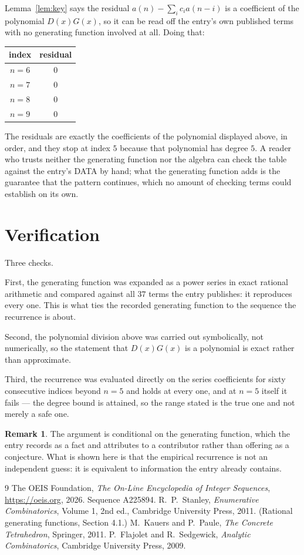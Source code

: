 \documentclass[11pt,a4paper]{article}
\theoremstyle{plain}
\theoremstyle{definition}
\newtheorem{remark}[theorem]{Remark}
\begin{document}
Lemma~\ref{lem:key} says the residual $a(n)-\sum_ic_ia(n-i)$ is a coefficient of the
polynomial $D(x)G(x)$, so it can be read off the entry's own published terms with no
generating function involved at all. Doing that:
\begin{center}
\begin{tabular}{cc}
index & residual \\ \hline
$n=6$ & $0$ \\
$n=7$ & $0$ \\
$n=8$ & $0$ \\
$n=9$ & $0$
\end{tabular}
\end{center}
The residuals are exactly the coefficients of the polynomial displayed above, in order, and
they stop at index $5$ because that polynomial has degree $5$. A reader who trusts
neither the generating function nor the algebra can check the table against the entry's DATA
by hand; what the generating function adds is the guarantee that the pattern continues, which
no amount of checking terms could establish on its own.

\section{Verification}

Three checks.

First, the generating function was expanded as a power series in exact rational arithmetic and
compared against all $37$ terms the entry publishes: it reproduces every one. This is
what ties the recorded generating function to the sequence the recurrence is about.

Second, the polynomial division above was carried out symbolically, not numerically, so the
statement that $D(x)G(x)$ is a polynomial is exact rather than approximate.

Third, the recurrence was evaluated directly on the series coefficients for sixty consecutive
indices beyond $n=5$ and holds at every one, and at $n=5$ itself it fails --- the
degree bound is attained, so the range stated is the true one and not merely a safe one.

\begin{remark}
The argument is conditional on the generating function, which the entry records as a fact and
attributes to a contributor rather than offering as a conjecture. What is shown here is that
the empirical recurrence is not an independent guess: it is equivalent to information the
entry already contains.
\end{remark}

\begin{thebibliography}{9}
 The OEIS Foundation, \emph{The On-Line Encyclopedia of Integer
Sequences}, \url{https://oeis.org}, 2026. Sequence A225894.
 R.~P.~Stanley, \emph{Enumerative Combinatorics}, Volume 1, 2nd ed.,
Cambridge University Press, 2011. (Rational generating functions, Section 4.1.)
 M.~Kauers and P.~Paule, \emph{The Concrete Tetrahedron}, Springer, 2011.
 P.~Flajolet and R.~Sedgewick, \emph{Analytic Combinatorics}, Cambridge
University Press, 2009.
\end{thebibliography}
\end{document}

